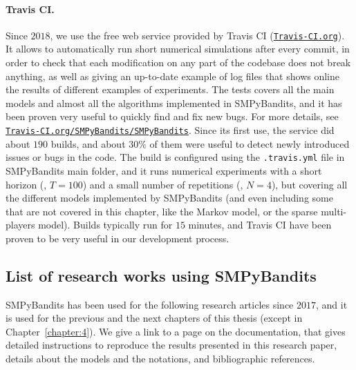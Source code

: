 \paragraph{Travis CI.}
Since $2018$, we use the free web service provided by Travis CI (\href{https://travis-ci.org/}{\texttt{Travis-CI.org}}).
It allows to automatically run short numerical simulations after every commit,
in order to check that each modification on any part of the codebase does not break anything, as well as giving an up-to-date example of log files that shows online the results of different examples of experiments. The tests covers all the main models and almost all the algorithms implemented in SMPyBandits, and it has been proven very useful to quickly find and fix new bugs.
For more details, see \href{https://travis-ci.org/SMPyBandits/SMPyBandits}{\texttt{Travis-CI.org/SMPyBandits/SMPyBandits}}.
%
Since its first use, the service did about $190$ builds, and about $30\%$ of them were useful to detect newly introduced issues or bugs in the code.
The build is configured using the \texttt{.travis.yml} file in SMPyBandits main folder, and it runs numerical experiments with a short horizon (\eg, $T=100$) and a small number of repetitions (\ie, $N=4$), but covering all the different models implemented by SMPyBandits (and even including some that are not covered in this chapter, like the Markov model, or the sparse multi-players model).
Builds typically run for $15$ minutes, and Travis CI have been proven to be very useful in our development process.



\subsection{List of research works using SMPyBandits}
\label{sub:3:listResearchWorksUsingSMPyBandits}

SMPyBandits has been used for the following research articles since $2017$, and it is used for the previous and the next chapters of this thesis (except in Chapter~\ref{chapter:4}).
%
We give a link to a page on the documentation, that gives detailed instructions to reproduce the results presented in this research paper, details about the models and the notations, and bibliographic references.

